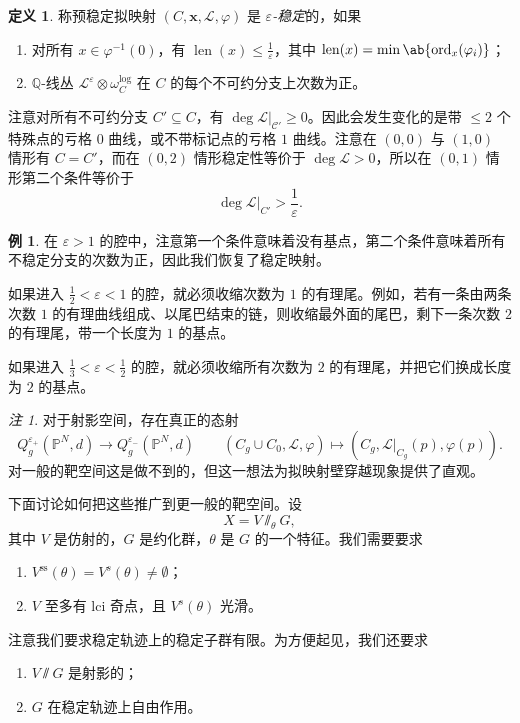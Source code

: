 \documentclass{amsart}
\theoremstyle{definition}
\newtheorem{defn}[thm]{定义}
\newtheorem{exm}[thm]{例}
\theoremstyle{remark}
\newtheorem{rmk}[thm]{注}
\theoremstyle{plain}
\theoremstyle{definition}
\theoremstyle{remark}
\newcommand{\Q}{\mathbb{Q}}
\renewcommand{\P}{\mathbb{P}}
\newcommand{\ep}{\varepsilon}
\newcommand{\mc}[1]{\mathcal{#1}}
\newcommand{\mr}[1]{\mathrm{#1}}
\newcommand{\on}[1]{\operatorname{#1}}
\newcommand{\1}{\mathbf{1}}
\newcommand{\2}{\mathbf{2}}
\newcommand{\3}{\mathbf{3}}
\begin{document}
\begin{defn}
    称预稳定拟映射 \((C, \mathbf{x}, \mc{L}, \varphi)\) 是 \textit{\(\ep\)-稳定}的，如果
    \begin{enumerate}
        \item 对所有 \(x \in \varphi^{-1}(0)\)，有 \(\on{len}(x) \leq \frac{1}{\ep}\)，其中 \(\on{len}(x) = \min \ab\{ \on{ord}_x (\varphi_i)\}\)；
        \item \(\Q\)-线丛 \(\mc{L}^{\ep} \otimes \omega_C^{\log}\) 在 \(C\) 的每个不可约分支上次数为正。
    \end{enumerate}
\end{defn}

注意对所有不可约分支 \(C' \subseteq C\)，有 \(\deg \mc{L}|_{\mc{C}'} \geq 0\)。因此会发生变化的是带 \(\leq 2\) 个特殊点的亏格 \(0\) 曲线，或不带标记点的亏格 \(1\) 曲线。注意在 \((0,0)\) 与 \((1,0)\) 情形有 \(C = C'\)，而在 \((0,2)\) 情形稳定性等价于 \(\deg \mc{L} > 0\)，所以在 \((0,1)\) 情形第二个条件等价于
\[ \deg \mc{L}|_{C'} > \frac{1}{\ep}. \]

\begin{exm}
    在 \(\ep > 1\) 的腔中，注意第一个条件意味着没有基点，第二个条件意味着所有不稳定分支的次数为正，因此我们恢复了稳定映射。

    如果进入 \(\frac{1}{2} < \ep < 1\) 的腔，就必须收缩次数为 \(1\) 的有理尾。例如，若有一条由两条次数 \(1\) 的有理曲线组成、以尾巴结束的链，则收缩最外面的尾巴，剩下一条次数 \(2\) 的有理尾，带一个长度为 \(1\) 的基点。

    如果进入 \(\frac{1}{3} < \ep < \frac{1}{2}\) 的腔，就必须收缩所有次数为 \(2\) 的有理尾，并把它们换成长度为 \(2\) 的基点。
\end{exm}

\begin{rmk}
    对于射影空间，存在真正的态射
    \[ Q_g^{\ep_+}(\P^N, d) \to Q_g^{\ep_-}(\P^N, d) \qquad (C_g \cup C_0, \mc{L}, \varphi) \mapsto (C_g, \mc{L}|_{C_g}(p), \varphi(p)). \]
    对一般的靶空间这是做不到的，但这一想法为拟映射壁穿越现象提供了直观。
\end{rmk}

下面讨论如何把这些推广到更一般的靶空间。设
\[ X = V \sslash_{\theta} G, \]
其中 \(V\) 是仿射的，\(G\) 是约化群，\(\theta\) 是 \(G\) 的一个特征。我们需要要求
\begin{enumerate}
    \item \(V^{\mr{ss}}(\theta) = V^s(\theta) \neq \emptyset\)；
    \item \(V\) 至多有 lci 奇点，且 \(V^s(\theta)\) 光滑。
\end{enumerate}
注意我们要求稳定轨迹上的稳定子群有限。为方便起见，我们还要求
\begin{enumerate}
    \item \(V \sslash G\) 是射影的；
    \item \(G\) 在稳定轨迹上自由作用。
\end{enumerate}
\end{document}
